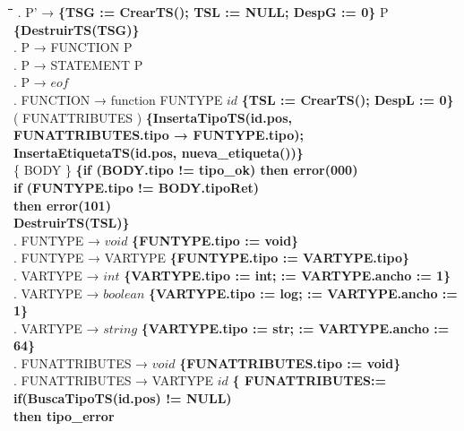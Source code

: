 \begin{tabbing}
    \hspace{1cm}\=\hspace{4.5cm}\=\hspace{2cm}\=\hspace{1cm}\=\hspace{1cm}\=\kill
    . P' → \textbf{\{TSG := CrearTS(); TSL := NULL; DespG := 0\}} P \textbf{\{DestruirTS(TSG)\}}\\
    . P → FUNCTION P\\
    . P → STATEMENT P\\
    . P → $eof$\\
    . FUNCTION → function FUNTYPE $id$ \textbf{\{TSL := CrearTS(); DespL := 0\}} \\
    \>              \>( FUNATTRIBUTES ) \textbf{\{InsertaTipoTS(id.pos, }\\
    \>              \> \textbf{FUNATTRIBUTES.tipo → FUNTYPE.tipo);}\\
    \>           \>\textbf{InsertaEtiquetaTS(id.pos, nueva\_etiqueta())\}}\\
    \>              \>\{ BODY \}\> \textbf{\{if (BODY.tipo != tipo\_ok) then error(000) }\\
    \>              \>          \> \textbf{ if (FUNTYPE.tipo != BODY.tipoRet)}\\
    \>              \>          \>             \>   \textbf{then error(101)}\\
    \>              \>          \> \textbf{DestruirTS(TSL)\}}\\
    . FUNTYPE → $void$ \textbf{\{FUNTYPE.tipo := void\}}\\
    . FUNTYPE → VARTYPE \textbf{\{FUNTYPE.tipo := VARTYPE.tipo\}}\\
    . VARTYPE → $int$ \textbf{\{VARTYPE.tipo := int; := VARTYPE.ancho := 1\}}\\
    . VARTYPE → $boolean$ \textbf{\{VARTYPE.tipo := log; := VARTYPE.ancho := 1\}}\\
    . VARTYPE → $string$ \textbf{\{VARTYPE.tipo := str; := VARTYPE.ancho := 64\}}\\
    . FUNATTRIBUTES → $void$ \textbf{\{FUNATTRIBUTES.tipo := void\}}\\
    . FUNATTRIBUTES → \>VARTYPE $id$ \textbf{\{
    FUNATTRIBUTES:=} \\
    \>\>\>\textbf{if(BuscaTipoTS(id.pos) != NULL)} \\
    \>              \>          \>
    \>\textbf{then tipo\_error}\\

\end{tabbing}
